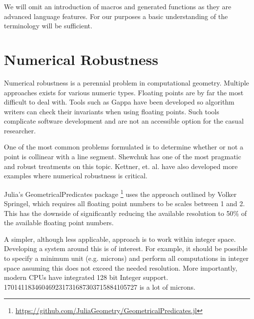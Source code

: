 We will omit an introduction of macros and generated functions
as they are advanced language
features. For our purposes a basic understanding of the terminology will
be sufficient.


\section{Numerical Robustness}

Numerical robustness is a perennial problem in computational geometry\cite{Shamos_1999}.
Multiple
approaches exists for various numeric types. Floating points are by far
the most difficult to deal with. Tools such as Gappa have been developed so
algorithm writers can check their invariants when using floating points\cite{Gappa}.
Such tools complicate software development and are not an accessible option
for the casual researcher.

One of the most common problems formulated is to determine whether or not a
point is collinear with a line segment. Shewchuk has one of the most pragmatic
and robust treatments on this topic\cite{Shewchuk}. Kettner, et. al. have also
developed more examples where numerical robustness is critical\cite{Kettner_Mehlhorn_Pion_Schirra_Yap_2008}.

Julia's GeometricalPredicates package \footnote{\url{https://github.com/JuliaGeometry/GeometricalPredicates.jl}}
uses the approach outlined by Volker Springel, which requires all floating point
numbers to be scales between 1 and 2\cite{Springel_2010}. This has the downside
of significantly reducing the available resolution to 50\% of the available
floating point numbers.

A simpler, although less applicable, approach is to work
within integer space. Developing a system around this is of interest. For
example, it should be possible to specify a minimum unit (e.g. microns)
and perform all computations in integer space assuming this does not exceed
the needed resolution. More importantly, modern CPUs have integrated 128 bit
Integer support. 170141183460469231731687303715884105727 is a lot of microns.



